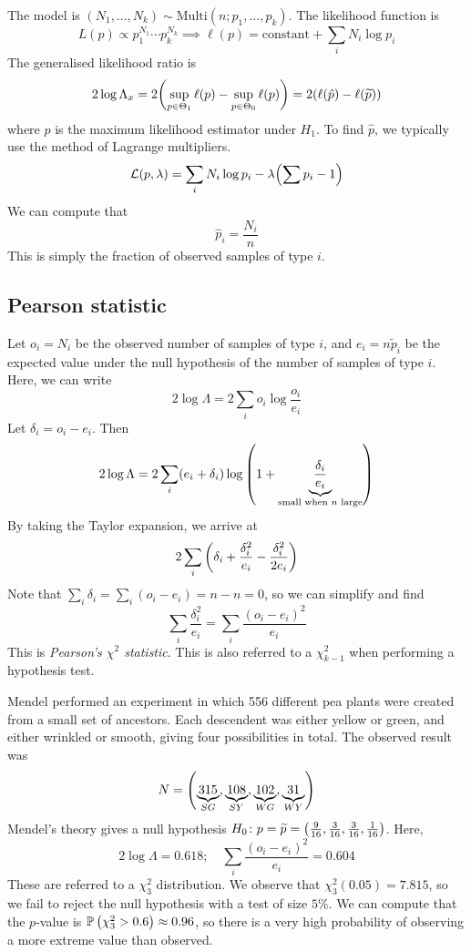 The model is \( (N_1, \dots, N_k) \sim \mathrm{Multi}(n; p_1, \dots, p_k) \).
The likelihood function is
\[ L(p) \propto p_1^{N_1} \cdots p_k^{N_k} \implies \ell(p) = \text{constant} + \sum_i N_i \log p_i \]
The generalised likelihood ratio is
\[ 2 \log \Lambda_x = 2\qty(\sup_{p \in \Theta_1} \ell(p) - \sup_{p \in \Theta_0} \ell(p)) = 2\qty(\ell(\hat p) - \ell(\widetilde p)) \]
where \( \hat p \) is the maximum likelihood estimator under \( H_1 \).
To find \( \hat p \), we typically use the method of Lagrange multipliers.
\[ \mathcal L(p, \lambda) = \sum_i N_i \log p_i - \lambda \qty(\sum p_i - 1) \]
We can compute that
\[ \hat p_i = \frac{N_i}{n} \]
This is simply the fraction of observed samples of type \( i \).

\subsection{Pearson statistic}
Let \( o_i = N_i \) be the observed number of samples of type \( i \), and \( e_i = n \widetilde p_i \) be the expected value under the null hypothesis of the number of samples of type \( i \).
Here, we can write
\[ 2 \log \Lambda = 2 \sum_i o_i \log \frac{o_i}{e_i} \]
Let \( \delta_i = o_i - e_i \).
Then
\[ 2 \log \Lambda = 2 \sum_i (e_i + \delta_i) \log\qty(1 + \underbrace{\frac{\delta_i}{e_i}}_{\text{small when } n \text{ large}}) \]
By taking the Taylor expansion, we arrive at
\[ 2 \sum_i \qty(\delta_i + \frac{\delta_i^2}{e_i} - \frac{\delta_i^2}{2e_i}) \]
Note that \( \sum_i \delta_i = \sum_i (o_i - e_i) = n - n = 0 \), so we can simplify and find
\[ \sum_i \frac{\delta_i^2}{e_i} = \sum_i \frac{(o_i - e_i)^2}{e_i} \]
This is \textit{Pearson's \( \chi^2 \) statistic}.
This is also referred to a \( \chi^2_{k-1} \) when performing a hypothesis test.
\begin{example}
	Mendel performed an experiment in which 556 different pea plants were created from a small set of ancestors.
	Each descendent was either yellow or green, and either wrinkled or smooth, giving four possibilities in total.
	The observed result was
	\[ N = \qty(\underbrace{315}_{SG}, \underbrace{108}_{SY}, \underbrace{102}_{WG}, \underbrace{31}_{WY}) \]
	Mendel's theory gives a null hypothesis \( H_0 \colon p = \widetilde p = \qty(\frac{9}{16}, \frac{3}{16}, \frac{3}{16}, \frac{1}{16}) \).
	Here,
	\[ 2 \log \Lambda = 0.618;\quad \sum_i \frac{(o_i - e_i)^2}{e_i} = 0.604 \]
	These are referred to a \( \chi^2_3 \) distribution.
	We observe that \( \chi^2_3(0.05) = 7.815 \), so we fail to reject the null hypothesis with a test of size \( 5\% \).
	We can compute that the \( p \)-value is \( \mathbb{P}\left({\chi^2_3 > 0.6}\right) \approx 0.96 \), so there is a very high probability of observing a more extreme value than observed.
\end{example}

